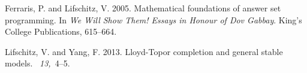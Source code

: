 \documentclass{tlp_mod}
\begin{document}
\begin{thebibliography}{}

{\sc Ferraris, P.} {\sc and} {\sc Lifschitz, V.} 2005.
\newblock Mathematical foundations of answer set programming.
\newblock In {\em We Will Show Them! Essays in Honour of Dov Gabbay}. King's
  College Publications, 615--664.

{\sc Lifschitz, V.} {\sc and} {\sc Yang, F.} 2013.
\newblock Lloyd-{T}opor completion and general stable models.
~{\em 13,\/}~4--5.

\end{thebibliography}
\end{document}
